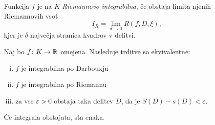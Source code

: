 \begin{definicija}
Funkcija $f$ je na $K$ \emph{Riemannovo integrabilna}, če obstaja
limita njenih Riemannovih vsot
\[
I_R = \lim_{\delta \to 0} R(f,D,\xi),
\]
kjer je $\delta$ največja stranica kvadrov v delitvi.
\end{definicija}


\begin{izrek}
Naj bo $f \colon K \to \mathbb{R}$ omejena. Naslednje trditve so
ekvivalentne:

\begin{enumerate}[i)]
\item $f$ je integrabilna po Darbouxju
\item $f$ je integrabilna po Riemannu
\item za vse $\varepsilon > 0$ obstaja taka delitev $D$, da je
$S(D) - s(D) < \varepsilon$.
\end{enumerate}

Če integrala obstajata, sta enaka.
\end{izrek}

